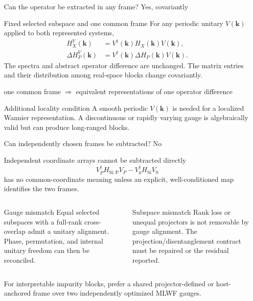\documentclass[aspectratio=169,10pt]{beamer}
\begin{document}
\begin{frame}{Can the operator be extracted in any frame? Yes, covariantly}
  \small
  \begin{block}{Fixed selected subspace and one common frame}
    For any periodic unitary $V(\mathbf k)$ applied to both represented systems,
    \begin{align*}
      H_X^{V}(\mathbf k)&=V^\dagger(\mathbf k)H_X(\mathbf k)V(\mathbf k),\\
      \Delta H_P^{V}(\mathbf k)&=V^\dagger(\mathbf k)\Delta H_P(\mathbf k)V(\mathbf k).
    \end{align*}
    The spectra and abstract operator difference are unchanged. The matrix entries and
    their distribution among real-space blocks change covariantly.
  \end{block}

  \begin{center}
    \Large
    one common frame
    $\Longrightarrow$
    equivalent representations of one operator difference
  \end{center}

  \begin{block}{Additional locality condition}
    A smooth periodic $V(\mathbf k)$ is needed for a localized Wannier representation.
    A discontinuous or rapidly varying gauge is algebraically valid but can produce
    long-ranged blocks.
  \end{block}
\end{frame}

\begin{frame}{Can independently chosen frames be subtracted? No}
  \begin{alertblock}{Independent coordinate arrays cannot be subtracted directly}
    \[
      V_P^\dagger H_{\mathrm{Si:P}}V_P
      -V_0^\dagger H_{\mathrm{Si}}V_0
    \]
    has no common-coordinate meaning unless an explicit, well-conditioned map identifies
    the two frames.
  \end{alertblock}

  \begin{columns}[T]
      \begin{block}{Gauge mismatch}
        Equal selected subspaces with a full-rank cross-overlap admit a unitary alignment.
        Phase, permutation, and internal unitary freedom can then be reconciled.
      \end{block}
      \begin{alertblock}{Subspace mismatch}
        Rank loss or unequal projectors is not removable by gauge alignment. The
        projection/disentanglement contract must be repaired or the residual reported.
      \end{alertblock}
  \end{columns}

  \vspace{0.5em}
  \centering
  For interpretable impurity blocks, prefer a shared projector-defined or host-anchored
  frame over two independently optimized MLWF gauges.
\end{frame}
\end{document}
